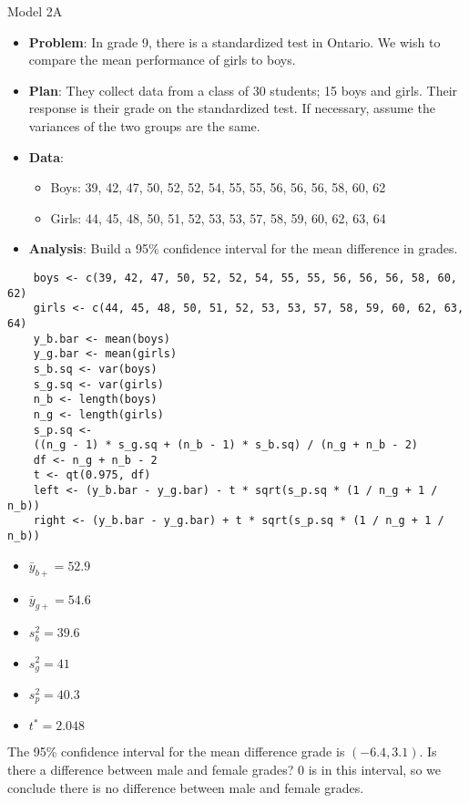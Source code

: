 \begin{Example}{Model 2A}{}
    \begin{itemize}
        \item \textbf{Problem}: In grade 9, there is a standardized test in Ontario.
              We wish to compare the mean performance of girls to boys.
        \item \textbf{Plan}: They collect data from a class of 30 students;
              15 boys and girls. Their response is their grade on the standardized test.
              If necessary, assume the variances of the two groups are the same.
        \item \textbf{Data}:
              \begin{itemize}
                  \item Boys: 39, 42, 47, 50, 52, 52, 54, 55, 55, 56, 56, 56, 58, 60, 62
                  \item Girls: 44, 45, 48, 50, 51, 52, 53, 53, 57, 58, 59, 60, 62, 63, 64
              \end{itemize}
        \item \textbf{Analysis}: Build a 95\% confidence interval for the mean difference
              in grades.
    \end{itemize}
    \begin{verbatim}
    boys <- c(39, 42, 47, 50, 52, 52, 54, 55, 55, 56, 56, 56, 58, 60, 62)
    girls <- c(44, 45, 48, 50, 51, 52, 53, 53, 57, 58, 59, 60, 62, 63, 64)
    y_b.bar <- mean(boys)
    y_g.bar <- mean(girls)
    s_b.sq <- var(boys)
    s_g.sq <- var(girls)
    n_b <- length(boys)
    n_g <- length(girls)
    s_p.sq <-
    ((n_g - 1) * s_g.sq + (n_b - 1) * s_b.sq) / (n_g + n_b - 2)
    df <- n_g + n_b - 2
    t <- qt(0.975, df)
    left <- (y_b.bar - y_g.bar) - t * sqrt(s_p.sq * (1 / n_g + 1 / n_b))
    right <- (y_b.bar - y_g.bar) + t * sqrt(s_p.sq * (1 / n_g + 1 / n_b))
    \end{verbatim}
    \begin{itemize}
        \item $ \bar{y}_{b+}=52.9 $
        \item $ \bar{y}_{g+}=54.6 $
        \item $ s_b^2=39.6 $
        \item $ s_g^2=41 $
        \item $ s_p^2=40.3 $
        \item $ t^*=2.048 $
    \end{itemize}
    The 95\% confidence interval for the mean difference grade is
    $ (-6.4,3.1) $. Is there a difference between male and female grades?
    0 is in this interval, so we conclude there is no difference between male
    and female grades.
\end{Example}
